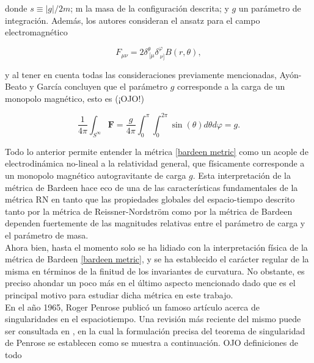 \documentclass{article}
\numberwithin{equation}{section}
\begin{document}
donde $s \equiv |g|/2m$; m la masa de la configuración descrita; y $g$ un parámetro de integración. Además, los autores consideran el ansatz para el campo electromagnético 

\begin{equation}
F_{\mu \nu} = 2 \delta^{\theta}_{\ \lbrack\mu} \delta^{\varphi}_{\ \nu\rbrack} B(r, \theta),
\end{equation}

y al tener en cuenta todas las consideraciones previamente mencionadas, Ayón-Beato y García concluyen que el parámetro $g$ corresponde a la carga de un monopolo magnético, esto es (¡OJO!)

\begin{equation}
\frac{1}{4 \pi} \int_{S^{\infty}}\mathbf{F} = \frac{g}{4 \pi} \int_{0}^{\pi}\int_{0}^{2\pi}\sin (\theta) d\theta d\varphi = g.
\end{equation}

Todo lo anterior permite entender la métrica \eqref{bardeen metric} como un acople de electrodinámica no-lineal a la relatividad general, que físicamente corresponde a un monopolo magnético autogravitante de carga $g$. Esta interpretación de la métrica de Bardeen hace eco de una de las características fundamentales de la métrica RN en tanto que las propiedades globales del espacio-tiempo descrito tanto por la métrica de Reissner-Nordström como por la métrica de Bardeen dependen fuertemente de las magnitudes relativas entre el parámetro de carga y el parámetro de masa.\\

Ahora bien, hasta el momento solo se ha lidiado con la interpretación física de la métrica de Bardeen \eqref{bardeen metric}, y se ha establecido el carácter regular de la misma en términos de la finitud de los invariantes de curvatura. No obstante, es preciso ahondar un poco más en el último aspecto mencionado dado que es el principal motivo para estudiar dicha métrica en este trabajo.\\

En el año 1965, Roger Penrose publicó un famoso artículo \cite{penrose} acerca de singularidades en el espaciotiempo. Una revisión más reciente del mismo puede ser consultada en \cite{senovilla2015}, en la cual la formulación precisa del teorema de singularidad de Penrose se establecen como se muestra a continuación. OJO definiciones de todo
\end{document}
